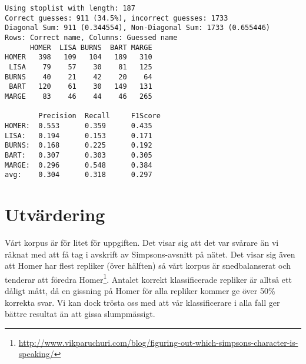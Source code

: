 \documentclass[a4paper]{article}
\begin{document}
\begin{verbatim}
Using stoplist with length: 187
Correct guesses: 911 (34.5%), incorrect guesses: 1733
Diagonal Sum: 911 (0.344554), Non-Diagonal Sum: 1733 (0.655446)
Rows: Correct name, Columns: Guessed name
      HOMER  LISA BURNS  BART MARGE 
HOMER   398   109   104   189   310 
 LISA    79    57    30    81   125 
BURNS    40    21    42    20    64 
 BART   120    61    30   149   131 
MARGE    83    46    44    46   265 

        Precision  Recall     F1Score    
HOMER:  0.553      0.359      0.435      
LISA:   0.194      0.153      0.171      
BURNS:  0.168      0.225      0.192      
BART:   0.307      0.303      0.305      
MARGE:  0.296      0.548      0.384      
avg:    0.304      0.318      0.297      
\end{verbatim}


\section{Utvärdering}

Vårt korpus är för litet för uppgiften. Det visar sig att det var
svårare än vi räknat med att få tag i avskrift av Simpsons-avsnitt på
nätet. Det visar sig även att Homer har flest repliker (över hälften)
så vårt korpus är snedbalanserat och tenderar att föredra
Homer\footnote{\url{http://www.vikparuchuri.com/blog/figuring-out-which-simpsons-character-is-speaking/}}.
Antalet korrekt klassificerade repliker är alltså ett dåligt mått, då
en gissning på Homer för alla repliker kommer ge över 50\% korrekta
svar. Vi kan dock trösta oss med att vår klassificerare i alla fall
ger bättre resultat än att gissa slumpmässigt.


\end{document}
